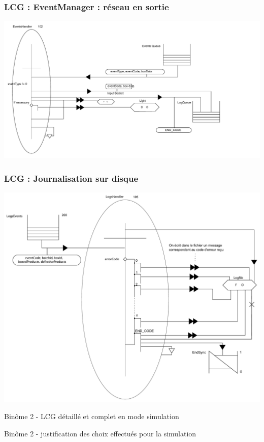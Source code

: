 \documentclass{beamer}
\begin{document}
\begin{frame}
    \frametitle{LCG : EventManager : réseau en sortie}
    \includegraphics[width=\textwidth]{../SchemasLCG/src/EventsManager.pdf}
\end{frame}


\begin{frame}
    \frametitle{LCG : Journalisation sur disque}
    \includegraphics[width=\textwidth]{../SchemasLCG/LogsManager.pdf}
\end{frame}

\begin{frame}
Binôme 2
- LCG détaillé et complet en mode simulation
\end{frame}

\begin{frame}
Binôme 2
- justification des choix effectués pour la simulation  
\end{frame}
\end{document}
